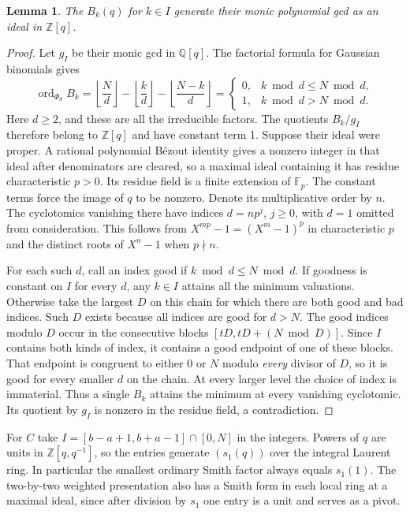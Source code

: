 \documentclass[11pt]{article}
\newtheorem{lemma}[theorem]{Lemma}
\newcommand{\Z}{\mathbb Z}
\newcommand{\Q}{\mathbb Q}
\newcommand{\F}{\mathbb F}
\newcommand{\ord}{\operatorname{ord}}
\begin{document}
\begin{lemma}\label{lem:interval}
The \(B_k(q)\) for \(k\in I\) generate their monic polynomial gcd as an
ideal in \(\Z[q]\).
\end{lemma}
\begin{proof}
Let \(g_I\) be their monic gcd in \(\Q[q]\). The factorial formula
for Gaussian binomials gives
\[
 \ord_{\Phi_d} B_k
 =\left\lfloor\frac Nd\right\rfloor-\left\lfloor\frac kd\right\rfloor
  -\left\lfloor\frac{N-k}d\right\rfloor
 =\begin{cases}0,&k\bmod d\le N\bmod d,\\1,&k\bmod d>N\bmod d.\end{cases}
\]
Here \(d\ge2\), and these are all the irreducible factors. The quotients
\(B_k/g_I\) therefore belong to \(\Z[q]\) and have constant term 1.
Suppose their ideal were proper. A rational polynomial B\'ezout identity
gives a nonzero integer in that ideal after denominators are cleared,
so a maximal ideal containing it has residue characteristic \(p>0\).
Its residue field is a finite extension of \(\F_p\). The constant terms
force the image of \(q\) to be nonzero. Denote its multiplicative order by
\(n\). The cyclotomics vanishing there have indices \(d=np^j\), \(j\ge0\),
with \(d=1\) omitted from consideration. This follows from
\(X^{mp}-1=(X^m-1)^p\) in characteristic \(p\) and the distinct roots
of \(X^n-1\) when \(p\nmid n\).

For each such \(d\), call an index good if \(k\bmod d\le N\bmod d\).
If goodness is constant on \(I\) for every \(d\), any \(k\in I\) attains
all the minimum valuations. Otherwise take the largest \(D\) on this
chain for which there are both good and bad indices. Such \(D\) exists
because all indices are good for \(d>N\). The good indices modulo \(D\)
occur in the consecutive blocks
\([tD,tD+(N\bmod D)]\). Since \(I\) contains both kinds of index, it
contains a good endpoint of one of these blocks. That endpoint is
congruent to either \(0\) or \(N\) modulo \emph{every} divisor of \(D\),
so it is good for every smaller \(d\) on the chain. At every larger
level the choice of index is immaterial. Thus a single \(B_k\) attains
the minimum at every vanishing cyclotomic. Its quotient by \(g_I\)
is nonzero in the residue field, a contradiction.
\end{proof}

For \(C\) take \(I=[b-a+1,b+a-1]\cap[0,N]\) in the integers. Powers of
\(q\) are units in \(\Z[q,q^{-1}]\), so the entries generate
\((s_1(q))\) over the integral Laurent ring. In particular the smallest
ordinary Smith factor always equals \(s_1(1)\). The
two-by-two weighted presentation also has a Smith form in each local
ring at a maximal ideal, since after division by \(s_1\) one entry
is a unit and serves as a pivot.
\end{document}
